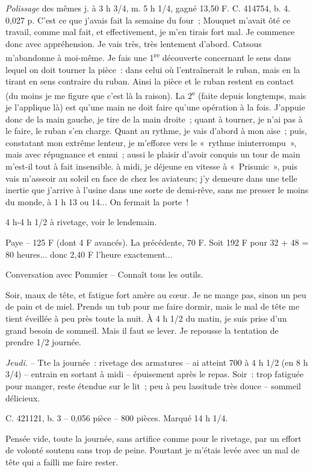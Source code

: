 \documentclass[french,twoside]{book} %
\begin{document}
{\itshape Polissage} des mêmes j. à 3 h 3/4, m. 5 h 1/4, gagné 13,50 F. C. 414754, b. 4. 0,027 p. C'est ce que j'avais fait la semaine du four ; Mouquet m'avait ôté ce travail, comme mal fait, et effectivement, je m'en tirais fort mal. Je commence donc avec appréhension. Je vais très, très lentement d'abord. Catsous m'abandonne à moi-même. Je fais une 1\textsuperscript{re} découverte concernant le sens dans lequel on doit tourner la pièce : dans celui où l'entraînerait le ruban, mais en la tirant en sens contraire du ruban. Ainsi la pièce et le ruban restent en contact (du moins je me figure que c'est là la raison). La 2\textsuperscript{e} (faite depuis longtemps, mais je l'applique là) est qu'une main ne doit faire qu'une opération à la fois. J'appuie donc de la main gauche, je tire de la main droite ; quant à tourner, je n'ai pas à le faire, le ruban s'en charge. Quant au rythme, je vais d'abord à mon aise ; puis, constatant mon extrême lenteur, je m'efforce vers le « rythme ininterrompu », mais avec répugnance et ennui ; aussi le plaisir d'avoir conquis un tour de main m'est-il tout à fait insensible. à midi, je déjeune en vitesse à « Prisunic », puis vais m'asseoir au soleil en face de chez les aviateurs; j'y demeure dans une telle inertie que j'arrive à l'usine dans une sorte de demi-rêve, sans me presser le moins du monde, à 1 h 13 ou 14... On fermait la porte !\par
4 h-4 h 1/2 à rivetage, voir le lendemain.\par
Paye – 125 F (dont 4 F avancés). La précédente, 70 F. Soit 192 F pour 32 + 48 = 80 heures... donc 2,40 F l'heure exactement...\par
Conversation avec Pommier – Connaît tous les outils.\par
Soir, maux de tête, et fatigue fort amère au cœur. Je ne mange pas, sinon un peu de pain et de miel. Prends un tub pour me faire dormir, mais le mal de tête me tient éveillée à peu près toute la nuit. À 4 h 1/2 du matin, je suis prise d'un grand besoin de sommeil. Mais il faut se lever. Je repousse la tentation de prendre 1/2 journée.\par
{\itshape Jeudi.} – Tte la journée : rivetage des armatures – ai atteint 700 à 4 h 1/2 (en 8 h 3/4) – entrain en sortant à midi – épuisement après le repas. Soir : trop fatiguée pour manger, reste étendue sur le lit ; peu à peu lassitude très douce – sommeil délicieux.\par
C. 421121, b. 3 – 0,056 pièce – 800 pièces. Marqué 14 h 1/4.\par
Pensée vide, toute la journée, sans artifice comme pour le rivetage, par un effort de volonté soutenu sans trop de peine. Pourtant je m'étais levée avec un mal de tête qui a failli me faire rester.\par
\end{document}
